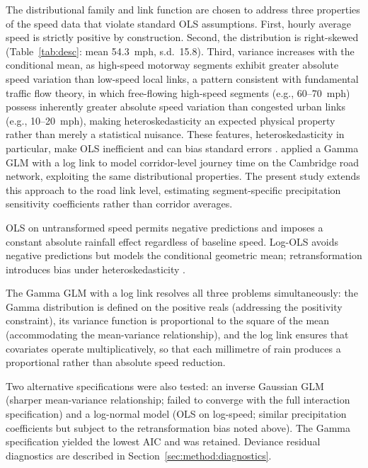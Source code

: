 \documentclass[review,authoryear]{elsarticle}
\begin{document}
The distributional family and link function are chosen to address three properties of the speed data that violate standard OLS assumptions. First, hourly average speed is strictly positive by construction. Second, the distribution is right-skewed (Table~\ref{tab:desc}: mean 54.3~\si{mph}, s.d.\ 15.8). Third, variance increases with the conditional mean, as high-speed motorway segments exhibit greater absolute speed variation than low-speed local links, a pattern consistent with fundamental traffic flow theory, in which free-flowing high-speed segments (e.g., 60--70~\si{mph}) possess inherently greater absolute speed variation than congested urban links (e.g., 10--20~\si{mph}), making heteroskedasticity an expected physical property rather than merely a statistical nuisance. These features, heteroskedasticity in particular, make OLS inefficient and can bias standard errors \citep{mccullagh1989glm}. \citet{wan2024paradox} applied a Gamma GLM with a log link to model corridor-level journey time on the Cambridge road network, exploiting the same distributional properties. The present study extends this approach to the road link level, estimating segment-specific precipitation sensitivity coefficients rather than corridor averages.

OLS on untransformed speed permits negative predictions and imposes a constant absolute rainfall effect regardless of baseline speed. Log-OLS avoids negative predictions but models the conditional geometric mean; retransformation introduces bias under heteroskedasticity \citep{mccullagh1989glm}.

The Gamma GLM with a log link resolves all three problems simultaneously: the Gamma distribution is defined on the positive reals (addressing the positivity constraint), its variance function is proportional to the square of the mean (accommodating the mean-variance relationship), and the log link ensures that covariates operate multiplicatively, so that each millimetre of rain produces a proportional rather than absolute speed reduction.

Two alternative specifications were also tested: an inverse Gaussian GLM (sharper mean-variance relationship; failed to converge with the full interaction specification) and a log-normal model (OLS on log-speed; similar precipitation coefficients but subject to the retransformation bias noted above). The Gamma specification yielded the lowest AIC and was retained. Deviance residual diagnostics are described in Section~\ref{sec:method:diagnostics}.
\end{document}
